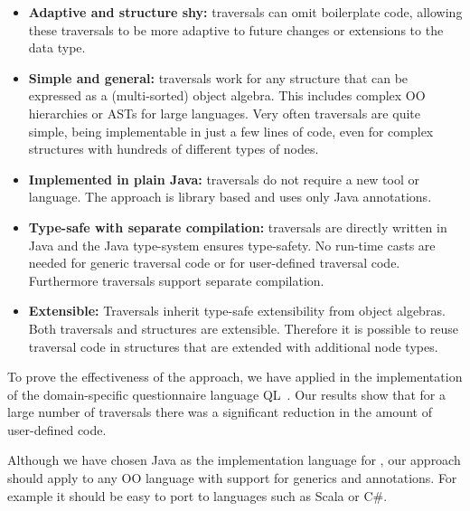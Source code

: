 \begin{itemize}

\item {\bf Adaptive and structure shy:} \name traversals can omit
  boilerplate code, allowing these traversals to be more adaptive to
  future changes or extensions to the data type.

\item {\bf Simple and general:} \name traversals work for any
  structure that can be expressed as a (multi-sorted) object
  algebra. This includes complex OO hierarchies or ASTs for large
  languages. Very often traversals are quite simple, being
  implementable in just a few lines of code, even for complex
  structures with hundreds of different types of nodes.

\item {\bf Implemented in plain Java:} \name traversals do not require
  a new tool or language. The approach is library based and uses only
  Java annotations.

\item {\bf Type-safe with separate compilation:} \name traversals are directly written in Java
  and the Java type-system ensures type-safety. No run-time casts are
  needed for generic traversal code or for user-defined traversal
  code. Furthermore \name traversals support separate compilation.

\item {\bf Extensible:} Traversals inherit type-safe
  extensibility from object algebras. Both traversals and structures
  are extensible. Therefore it is possible to
  reuse traversal code in structures that are extended with additional
  node types.


\end{itemize}

To prove the effectiveness of the approach, we have applied \name
in the implementation of the domain-specific questionnaire
language QL~\cite{gouseti14extensible}.
Our results show that for a large number of traversals
there was a significant reduction in the amount of user-defined code.

Although we have chosen Java as the implementation language for \Name,
our approach should apply to any OO language with support for generics
and annotations. For example it should be easy to port \name to
languages such as Scala or C\#.


